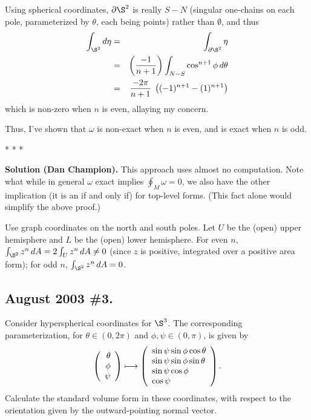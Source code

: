 \documentclass[10pt]{article}
\numberwithin{equation}{subsection}
\begin{document}
Using spherical coordinates, $\D\S^2$ is really $S-N$ (singular one-chains on
each pole, parameterized by $\theta$, each being points) rather than
$\emptyset$, and thus
\begin{eqnarray*}
	\int_{\S^2} d\eta &=& \int_{\D\S^2}\eta \\
	&=& \left(\frac{-1}{n+1}\right)
		\int_{N-S}
	\cos^{n+1}\phi\,d\theta \\
	&=& \frac{-2\pi}{n+1}\; \left( (-1)^{n+1} - (1)^{n+1} \right)
\end{eqnarray*}
which is non-zero when $n$ is even, allaying my concern.

Thus, I've shown that $\omega$ is non-exact when $n$ is even, and is exact when
$n$ is odd.

\begin{center}* * *\end{center}

\textbf{Solution (Dan Champion).}  This approach uses almost no computation.
Note what while in general $\omega$ exact implies $\oint_M \omega = 0$, we also
have the other implication (it is an if and only if) for top-level forms.
(This fact alone would simplify the above proof.)

Use graph coordinates on the north and south poles.  Let $U$ be the (open)
upper hemisphere and $L$ be the (open) lower hemisphere.  For even $n$,
$\int_{\S^2}z^n\,dA = 2 \int_{U}z^n\,dA \ne 0$ (since $z$ is positive,
integrated over a positive area form); for odd $n$, $\int_{\S^2}z^n\,dA = 0$.

\subsection{August 2003 \#3.}

Consider hyperspherical coordinates for $\S^3$.  The corresponding
parameterization, for $\theta \in (0, 2\pi)$ and $\phi,\psi \in (0, \pi)$, is
given by
$$
	\left(\begin{array}{r} \theta \\ \phi \\ \psi\end{array}\right) \longmapsto
	\left(\begin{array}{l} \sin\psi\sin\phi\cos\theta \\ \sin\psi\sin\phi\sin\theta \\ \sin\psi\cos\phi \\ \cos\psi\end{array}\right).
$$
Calculate the standard volume form in these coordinates, with respect to the
orientation given by the outward-pointing normal vector.
\end{document}
